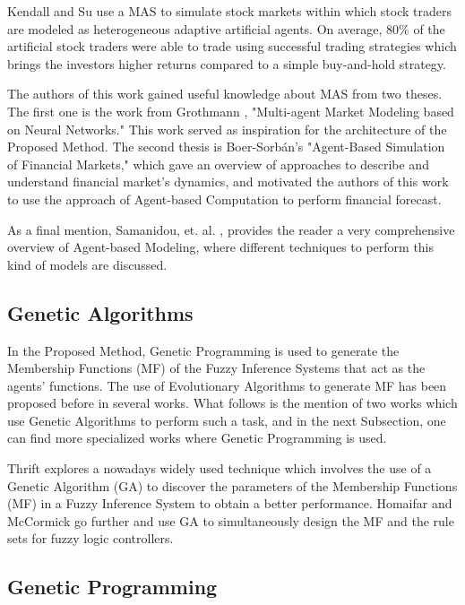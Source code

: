 Kendall and Su \cite{Kendall2003} use a MAS to simulate stock markets within which stock traders are modeled as heterogeneous adaptive artificial agents. On average, 80\% of the artificial stock traders were able to trade using successful trading strategies which brings the investors higher returns compared to a simple buy-and-hold strategy.

The authors of this work gained useful knowledge about MAS from two theses. The first one is the work from Grothmann \cite{Grothmann2002}, "Multi-agent Market Modeling based on Neural Networks." This work served as inspiration for the architecture of the Proposed Method. The second thesis is Boer-Sorbán's "Agent-Based Simulation of Financial Markets," which gave an overview of approaches to describe and understand financial market's dynamics, and motivated the authors of this work to use the approach of Agent-based Computation to perform financial forecast.

As a final mention, Samanidou, et. al. \cite{Samanidou_2007}, provides the reader a very comprehensive overview of Agent-based Modeling, where different techniques to perform this kind of models are discussed.

\subsection{Genetic Algorithms}
\label{genetic-algorithms}

In the Proposed Method, Genetic Programming is used to generate the Membership Functions (MF) of the Fuzzy Inference Systems that act as the agents' functions. The use of Evolutionary Algorithms to generate MF has been proposed before in several works. What follows is the mention of two works which use Genetic Algorithms to perform such a task, and in the next Subsection, one can find more specialized works where Genetic Programming is used.

Thrift \cite{Thrift1991} explores a nowadays widely used technique which involves the use of a Genetic Algorithm (GA) to discover the parameters of the Membership Functions (MF) in a Fuzzy Inference System to obtain a better performance. Homaifar and McCormick \cite{Homaifar1995} go further and use GA to simultaneously design the MF and the rule sets for fuzzy logic controllers.

\subsection{Genetic Programming}
\label{genetic-programming}

